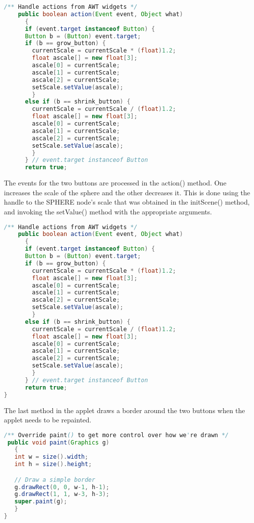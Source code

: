 \begin{lstlisting}[language=Java, caption={}, numbers=none, frame=none]
/** Handle actions from AWT widgets */
    public boolean action(Event event, Object what)
      {
      if (event.target instanceof Button) {
      Button b = (Button) event.target;
      if (b == grow_button) {
        currentScale = currentScale * (float)1.2;
        float ascale[] = new float[3];
        ascale[0] = currentScale;
        ascale[1] = currentScale;
        ascale[2] = currentScale;
        setScale.setValue(ascale);
        }
      else if (b == shrink_button) {
        currentScale = currentScale / (float)1.2;
        float ascale[] = new float[3];
        ascale[0] = currentScale;
        ascale[1] = currentScale;
        ascale[2] = currentScale;
        setScale.setValue(ascale);
        }
      } // event.target instanceof Button
      return true;
\end{lstlisting}

The events for the two buttons are processed in the action() method. One increases the scale of the sphere and the other decreases it. This is done using the handle to the SPHERE node's scale that was obtained in the initScene() method, and invoking the setValue() method with the appropriate arguments.

\begin{lstlisting}[language=Java, caption={}, numbers=none, frame=none]
/** Handle actions from AWT widgets */
    public boolean action(Event event, Object what)
      {
      if (event.target instanceof Button) {
      Button b = (Button) event.target;
      if (b == grow_button) {
        currentScale = currentScale * (float)1.2;
        float ascale[] = new float[3];
        ascale[0] = currentScale;
        ascale[1] = currentScale;
        ascale[2] = currentScale;
        setScale.setValue(ascale);
        }
      else if (b == shrink_button) {
        currentScale = currentScale / (float)1.2;
        float ascale[] = new float[3];
        ascale[0] = currentScale;
        ascale[1] = currentScale;
        ascale[2] = currentScale;
        setScale.setValue(ascale);
        }
      } // event.target instanceof Button
      return true;
}
\end{lstlisting}

The last method in the applet draws a border around the two buttons when the applet needs to be repainted.

\begin{lstlisting}[language=Java, caption={}, numbers=none, frame=none]
/** Override paint() to get more control over how we're drawn */
 public void paint(Graphics g)
   {
   int w = size().width;
   int h = size().height;

   // Draw a simple border
   g.drawRect(0, 0, w-1, h-1);
   g.drawRect(1, 1, w-3, h-3);
   super.paint(g);
   }
}
\end{lstlisting}


